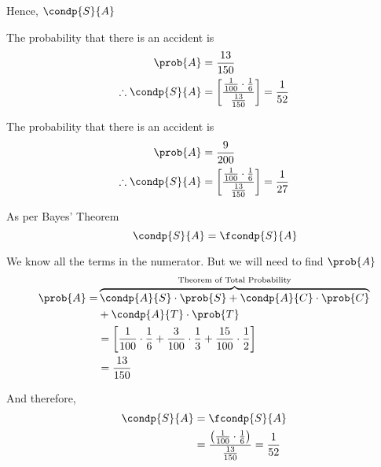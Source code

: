 \documentclass[14pt,fleqn]{extarticle}
\begin{document}
\begin{problem}
\begin{step}
     Hence, $\condp{S}{A}$ 
       
\end{step}

\begin{step}
  \begin{options} 
     \correct 
     
       The probability that there is an accident is 
       \begin{align}
       \prob{A} &= \frac{13}{150} \\
       \therefore \condp{S}{A} &= \left[ \dfrac{\frac{1}{100}\cdot\frac{1}{6}}{\frac{13}{150}}\right] =\frac{1}{52} 
\end{align}
     \incorrect
     
     The probability that there is an accident is 
       \begin{align}
       \prob{A} &= \frac{9}{200} \\
       \therefore \condp{S}{A} &= \left[ \dfrac{\frac{1}{100}\cdot\frac{1}{6}}{\frac{13}{150}}\right] =\frac{1}{27} 
\end{align}
        
    \end{options} 
     \reason 
       
     As per Bayes' Theorem 
     \[ \qquad \condp{S}{A} = \fcondp{S}{A}  \]
     
     We know all the terms in the numerator. But we will need to find $\prob{A}$
     \begin{align}
	\prob{A} = &\overbrace{\condp{A}{S}\cdot\prob{S} + \condp{A}{C}\cdot\prob{C}}^{\text{Theorem of Total Probability}} \\
	&+ \condp{A}{T}\cdot\prob{T} \\
	&= \left[ \frac{1}{100}\cdot\frac{1}{6} + \frac{3}{100}\cdot\frac{1}{3} + \frac{15}{100}\cdot\frac{1}{2} \right] \\
	&= \frac{13}{150} 
\end{align}

And therefore, 
\begin{align}
\condp{S}{A} &= \fcondp{S}{A} \\
&= \dfrac{ \left( \frac{1}{100}\cdot\frac{1}{6}\right)}{\frac{13}{150}} = \frac{1}{52}
\end{align}

\end{step}
          
\end{problem} 
\end{document}

